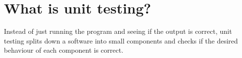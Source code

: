 \section{What is unit testing?}
Instead of just running the program and seeing if the output is correct,
unit testing splits down a software into small components and checks if the desired behaviour of each component is correct.
